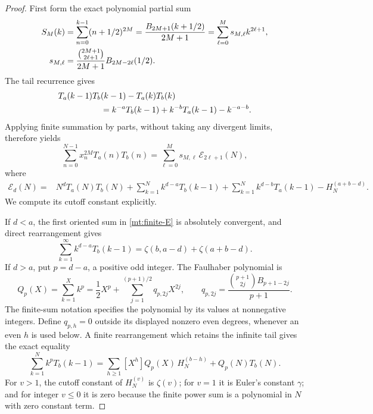 \begin{proof}
First form the exact polynomial partial sum
\begin{align}
 S_M(k)&=\sum_{n=0}^{k-1}(n+1/2)^{2M}
       =\frac{B_{2M+1}(k+1/2)}{2M+1}
       =\sum_{\ell=0}^{M}s_{M,\ell}k^{2\ell+1},
 \label{mt:S}\\
 s_{M,\ell}&=\frac{\binom{2M+1}{2\ell+1}}{2M+1}
                         B_{2M-2\ell}(1/2).
 \notag
\end{align}
The tail recurrence gives
\begin{align*}
&T_a(k-1)T_b(k-1)-T_a(k)T_b(k)\\
&\hspace{18mm}=k^{-a}T_b(k-1)+k^{-b}T_a(k-1)-k^{-a-b}.
\end{align*}
Applying finite summation by parts, without taking any divergent limits,
therefore yields
\begin{equation}\label{mt:finite-sbp}
 \sum_{n=0}^{N-1}x_n^{2M}T_a(n)T_b(n)
 =\sum_{\ell=0}^{M}s_{M,\ell}\,\mathcal E_{2\ell+1}(N),
\end{equation}
where
\begin{align}
 \mathcal E_d(N)={}&N^dT_a(N)T_b(N)
   +\sum_{k=1}^N k^{d-a}T_b(k-1)
   +\sum_{k=1}^N k^{d-b}T_a(k-1)
   -H_N^{(a+b-d)}.
 \label{mt:finite-E}
\end{align}
We compute its cutoff constant explicitly.

If $d<a$, the first oriented sum in \eqref{mt:finite-E} is absolutely
convergent, and direct rearrangement gives
\begin{equation}\label{mt:convergent-oriented}
 \sum_{k=1}^{\infty}k^{d-a}T_b(k-1)
 =\zeta(b,a-d)+\zeta(a+b-d).
\end{equation}
If $d>a$, put $p=d-a$, a positive odd integer. The Faulhaber
polynomial is
\begin{equation}\label{mt:faulhaber}
 Q_p(X)=\sum_{k=1}^X k^p
   =\frac12X^p+\sum_{j=1}^{(p+1)/2}q_{p,2j}X^{2j},
 \qquad
 q_{p,2j}=\frac{\binom{p+1}{2j}B_{p+1-2j}}{p+1}.
\end{equation}
The finite-sum notation specifies the polynomial by its values at
nonnegative integers. Define $q_{p,h}=0$ outside its displayed
nonzero even degrees, whenever an even $h$ is used below. A finite
rearrangement which retains the infinite tail gives the exact equality
\begin{equation}\label{mt:finite-rearrangement}
 \sum_{k=1}^N k^pT_b(k-1)
  =\sum_{h\ge1}[X^h]Q_p(X)\,H_N^{(b-h)}
    +Q_p(N)T_b(N).
\end{equation}
For $v>1$, the cutoff constant of $H_N^{(v)}$ is $\zeta(v)$;
for $v=1$ it is Euler's constant $\gamma$; and for integer $v\le0$
it is zero because the finite power sum is a polynomial in $N$ with
zero constant term.


\end{proof}
